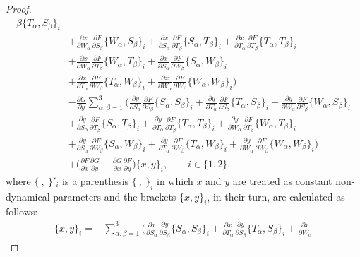 \documentclass[10pt,a4paper]{amsart}
\def\a{\alpha}
\def\b{\beta}
\numberwithin{equation}{section}
\begin{document}
\begin{proof}
\begin{align*}
{{\b}}\{T_{\a},S_{\b}\}_i\\
&+ \frac{\partial x}{\partial W_{ \a}}
\frac{\partial F}{\partial S_{ \b}}\{W_{\a},S_{\b}\}_i+ \frac{\partial x}{\partial S_{ \a}}
\frac{\partial F}{\partial T_{ \b}}\{S_{\a},T_{\b}\}_i+ \frac{\partial x}{\partial T_{ \a}} \frac{\partial F}{\partial T_{ \b}}\{T_{\a},T_{\b}\}_i
\\
&+
 \frac{\partial x}{\partial W_{ \a}}
\frac{\partial F}{\partial T_{ \b}}\{W_{\a},T_{\b}\}_i+ \frac{\partial x}{\partial S_{ \a}}
\frac{\partial F}{\partial W_{ \b}}\{S_{\a},W_{\b}\}_i \\
&+ \frac{\partial x}{\partial T_{ \a}} \frac{\partial F}{\partial
W_{ \b}}\{T_{\a},W_{\b}\}_i
+\frac{\partial x}{\partial W_{ \a}}
\frac{\partial F}{\partial W_{ \b}}\{W_{\a},W_{\b}\}_i \biggr)
\\
& -
 \frac{\partial G}{ \partial y} \sum\limits_{\a,\b=1}^3\biggl( \frac{\partial y}{\partial S_{ \a}}
\frac{\partial F}{\partial S_{ \b}}\{S_{\a},S_{\b}\}_i+
\frac{\partial y}{\partial T_{ \a}} \frac{\partial F}{\partial S_{
\b}}\{T_{\a},S_{\b}\}_i+\frac{\partial y}{\partial W_{ \a}}
\frac{\partial F}{\partial S_{ \b}}\{W_{\a},S_{\b}\}_i
\\
&+ \frac{\partial y}{\partial S_{ \a}}
\frac{\partial F}{\partial T_{ \b}}\{S_{\a},T_{\b}\}_i+ \frac{\partial y}{\partial T_{ \a}} \frac{\partial F}{\partial
T_{ \b}}\{T_{\a},T_{\b}\}_i+\frac{\partial y}{\partial W_{ \a}}
\frac{\partial F}{\partial T_{ \b}}\{W_{\a},T_{\b}\}_i\\
&+ \frac{\partial y}{\partial S_{ \a}}
\frac{\partial F}{\partial W_{ \b}}\{S_{\a},W_{\b}\}_i+ \frac{\partial y}{\partial T_{ \a}} \frac{\partial F}{\partial
W_{ \b}}\{T_{\a},W_{\b}\}_i + \frac{\partial y}{\partial W_{ \a}}
\frac{\partial F}{\partial W_{ \b}}\{W_{\a},W_{\b}\}_i \biggr)\\
&+ \biggl( \frac{\partial F}{ \partial x} \frac{\partial G}{ \partial y}- \frac{\partial G}{ \partial x}\frac{\partial F}{ \partial y} \biggr)\{x,y\}_i, \qquad i\in \{1,2\},
\end{align*}
where $\{ \ , \ \}'_i$ is a parenthesis $\{\ , \ \}_i$ in which $x$ and $y$ are treated as constant non-dynamical parameters
and the brackets $\{x,y\}_i$, in their turn, are calculated as follows:
\begin{align*}%
\{ x, y \}_i={}&
\sum\limits_{\a,\b=1}^3\biggl( \frac{\partial x}{\partial S_{ \a}}
\frac{\partial y}{\partial S_{ \b}}\{S_{\a},S_{\b}\}_i+
\frac{\partial x}{\partial T_{ \a}} \frac{\partial y}{\partial S_{
\b}}\{T_{\a},S_{\b}\}_i+ \frac{\partial x}{\partial W_{ \a}}

\end{align*}
\end{proof}
\end{document}
